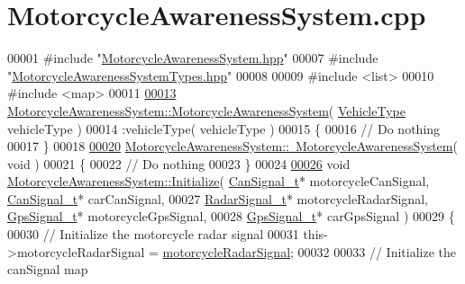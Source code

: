 \hypertarget{MotorcycleAwarenessSystem_8cpp_source}{\section{Motorcycle\-Awareness\-System.\-cpp}
}

\begin{DoxyCode}
00001 \textcolor{preprocessor}{#include "\hyperlink{MotorcycleAwarenessSystem_8hpp}{MotorcycleAwarenessSystem.hpp}"}
00007 \textcolor{preprocessor}{#include "\hyperlink{MotorcycleAwarenessSystemTypes_8hpp}{MotorcycleAwarenessSystemTypes.hpp}"}
00008 
00009 \textcolor{preprocessor}{#include <list>}
00010 \textcolor{preprocessor}{#include <map>}
00011 
\hypertarget{MotorcycleAwarenessSystem_8cpp_source_l00013}{}\hyperlink{classMotorcycleAwarenessSystem_ab0fb3823809dc056fecc82cc72a80a55}{00013} \hyperlink{classMotorcycleAwarenessSystem_ab0fb3823809dc056fecc82cc72a80a55}{MotorcycleAwarenessSystem::MotorcycleAwarenessSystem}( 
      \hyperlink{MotorcycleAwarenessSystemTypes_8hpp_a0c05c42b98a847f971385c81c2a81afa}{VehicleType} vehicleType )
00014     :vehicleType( vehicleType )
00015 \{
00016     \textcolor{comment}{// Do nothing}
00017 \}
00018 
\hypertarget{MotorcycleAwarenessSystem_8cpp_source_l00020}{}\hyperlink{classMotorcycleAwarenessSystem_a89ce16a722b3575e1415cbe9c7eedbd3}{00020} \hyperlink{classMotorcycleAwarenessSystem_a89ce16a722b3575e1415cbe9c7eedbd3}{MotorcycleAwarenessSystem::~MotorcycleAwarenessSystem}(
       \textcolor{keywordtype}{void} )
00021 \{
00022     \textcolor{comment}{// Do nothing}
00023 \}
00024 
\hypertarget{MotorcycleAwarenessSystem_8cpp_source_l00026}{}\hyperlink{classMotorcycleAwarenessSystem_a55f1ea16b6311120ea42b460fb8b3a71}{00026} \textcolor{keywordtype}{void} \hyperlink{classMotorcycleAwarenessSystem_a55f1ea16b6311120ea42b460fb8b3a71}{MotorcycleAwarenessSystem::Initialize}( 
      \hyperlink{structCanSignal__t}{CanSignal\_t}* motorcycleCanSignal, \hyperlink{structCanSignal__t}{CanSignal\_t}* carCanSignal,
00027                                             \hyperlink{structRadarSignal__t}{RadarSignal\_t}* motorcycleRadarSignal, 
      \hyperlink{structGpsSignal__t}{GpsSignal\_t}* motorcycleGpsSignal,
00028                                             \hyperlink{structGpsSignal__t}{GpsSignal\_t}* carGpsSignal  )
00029 \{
00030     \textcolor{comment}{// Initialize the motorcycle radar signal}
00031     this->motorcycleRadarSignal = \hyperlink{classMotorcycleAwarenessSystem_a0744e71b9f440a86f5078c876ba7629b}{motorcycleRadarSignal};
00032 
00033     \textcolor{comment}{// Initialize the canSignal map}

\end{DoxyCode}
